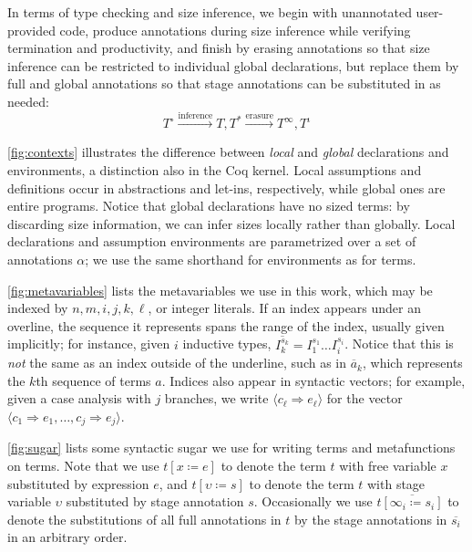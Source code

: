 \documentclass[nonacm,screen,10pt]{acmart}
\begin{document}
In terms of type checking and size inference, we begin with unannotated user-provided code, produce annotations during size inference while verifying termination and productivity, and finish by erasing annotations so that size inference can be restricted to individual global declarations, but replace them by full and global annotations so that stage annotations can be substituted in as needed:
\begin{equation*}
    T^\circ \xrightarrow{\text{inference}} T, T^* \xrightarrow{\text{erasure}} T^\infty, T^\iota
\end{equation*}



\autoref{fig:contexts} illustrates the difference between \textit{local} and \textit{global} declarations and environments, a distinction also in the Coq kernel. Local assumptions and definitions occur in abstractions and let-ins, respectively, while global ones are entire programs. Notice that global declarations have no sized terms: by discarding size information, we can infer sizes locally rather than globally. Local declarations and assumption environments are parametrized over a set of annotations $\alpha$; we use the same shorthand for environments as for terms.





\autoref{fig:metavariables} lists the metavariables we use in this work, which may be indexed by $n, m, i, j, k, \ell$, or integer literals. If an index appears under an overline, the sequence it represents spans the range of the index, usually given implicitly; for instance, given $i$ inductive types, $\overline{I_k^{s_k}} = I_1^{s_1} \dots I_i^{s_i}$. Notice that this is \textit{not} the same as an index outside of the underline, such as in $\overline{a}_k$, which represents the $k$th sequence of terms $a$. Indices also appear in syntactic vectors; for example, given a case analysis with $j$ branches, we write $\langle c_\ell \Rightarrow e_\ell \rangle$ for the vector $\langle c_1 \Rightarrow e_1, \dots, c_j \Rightarrow e_j \rangle$.

\autoref{fig:sugar} lists some syntactic sugar we use for writing terms and metafunctions on terms. Note that we use $t[x \coloneqq e]$ to denote the term $t$ with free variable $x$ substituted by expression $e$, and $t[\upsilon \coloneqq s]$ to denote the term $t$ with stage variable $\upsilon$ substituted by stage annotation $s$. Occasionally we use $t\overline{[\infty_i \coloneqq s_i]}$ to denote the substitutions of all full annotations in $t$ by the stage annotations in $\overline{s_i}$ in an arbitrary order.
\end{document}
